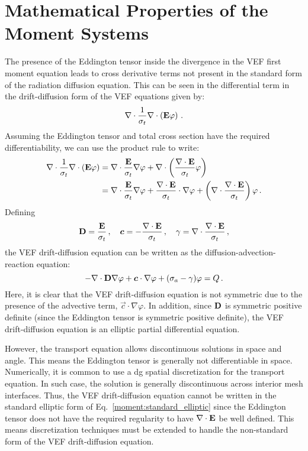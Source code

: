 \documentclass[../doc.tex]{subfiles}
\begin{document}
\section{Mathematical Properties of the Moment Systems}
The presence of the Eddington tensor inside the divergence in the VEF first moment equation leads to cross derivative terms not present in the standard form of the radiation diffusion equation. This can be seen in the differential term in the drift-diffusion form of the VEF equations given by:
	\begin{equation}
		\nabla\cdot\frac{1}{\sigma_t}\nabla\cdot\left( \boldsymbol{\mathrm{E}}\varphi \right) \,. 
	\end{equation}
Assuming the Eddington tensor and total cross section have the required differentiability, we can use the product rule to write:
	\begin{equation}
	\begin{aligned}
		\nabla\cdot\frac{1}{\sigma_t}\nabla\cdot\left( \boldsymbol{\mathrm{E}}\varphi \right) &= \nabla\cdot\frac{\boldsymbol{\mathrm{E}}}{\sigma_t}\nabla\varphi + \nabla\cdot\left( \frac{\nabla\cdot\boldsymbol{\mathrm{E}}}{\sigma_t}\varphi \right) \\
		&= \nabla\cdot\frac{\boldsymbol{\mathrm{E}}}{\sigma_t}\nabla\varphi + \frac{\nabla\cdot\boldsymbol{\mathrm{E}}}{\sigma_t}\cdot\nabla\varphi + \left( \nabla\cdot\frac{\nabla\cdot\boldsymbol{\mathrm{E}}}{\sigma_t} \right) \varphi \,. 
	\end{aligned}
	\end{equation}
Defining 
	\begin{equation}
		\boldsymbol{\mathrm{D}} = \frac{\boldsymbol{\mathrm{E}}}{\sigma_t}\,,\quad \boldsymbol{c} = -\frac{\nabla\cdot\boldsymbol{\mathrm{E}}}{\sigma_t}\,, \quad \gamma = \nabla\cdot\frac{\nabla\cdot\boldsymbol{\mathrm{E}}}{\sigma_t} \,,
	\end{equation}
the VEF drift-diffusion equation can be written as the diffusion-advection-reaction equation: 
	\begin{equation} \label{moment:standard_elliptic}
		-\nabla\cdot\boldsymbol{\mathrm{D}}\nabla\varphi + \boldsymbol{c}\cdot\nabla\varphi + (\sigma_a - \gamma) \varphi = Q \,. 
	\end{equation}
Here, it is clear that the VEF drift-diffusion equation is not symmetric due to the presence of the advective term, $\vec{c}\cdot\nabla\varphi$. In addition, since $\boldsymbol{\mathrm{D}}$ is symmetric positive definite (since the Eddington tensor is symmetric positive definite), the VEF drift-diffusion equation is an elliptic partial differential equation. 

However, the transport equation allows discontinuous solutions in space and angle. This means the Eddington tensor is generally not differentiable in space. Numerically, it is common to use a \gls{dg} spatial discretization for the transport equation. In such case, the solution is generally discontinuous across interior mesh interfaces. Thus, the VEF drift-diffusion equation cannot be written in the standard elliptic form of Eq.~\ref{moment:standard_elliptic} since the Eddington tensor does not have the required regularity to have $\nabla\cdot\boldsymbol{\mathrm{E}}$ be well defined. This means discretization techniques must be extended to handle the non-standard form of the VEF drift-diffusion equation. 
\end{document}
